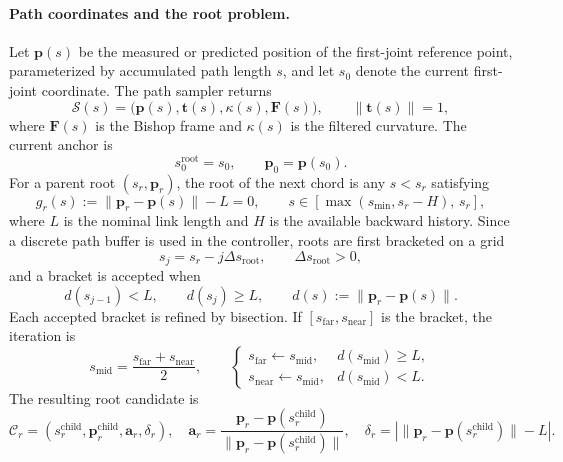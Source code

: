 \documentclass[12pt,a4paper]{report}
\begin{document}
\paragraph{Path coordinates and the root problem.}
Let $\mathbf{p}(s)$ be the measured or predicted position of the first-joint
reference point, parameterized by accumulated path length $s$, and let
$s_0$ denote the current first-joint coordinate. The path sampler returns
\[
\mathcal{S}(s)=
\bigl(\mathbf{p}(s),\mathbf{t}(s),\kappa(s),\mathbf{F}(s)\bigr),
\qquad \|\mathbf{t}(s)\|=1,
\]
where $\mathbf{F}(s)$ is the Bishop frame and $\kappa(s)$ is the filtered
curvature. The current anchor is
\begin{equation}
s_0^{\mathrm{root}}=s_0,\qquad
\mathbf{p}_0=\mathbf{p}(s_0).
\tag{8.84}
\label{eq:ch8-root-anchor}
\end{equation}
For a parent root $(s_r,\mathbf{p}_r)$, the root of the next chord is any
$s<s_r$ satisfying
\begin{equation}
g_r(s):=\|\mathbf{p}_r-\mathbf{p}(s)\|-L=0,
\qquad
s\in\left[\max(s_{\min},s_r-H),\,s_r\right],
\tag{8.85}
\label{eq:ch8-root-equation}
\end{equation}
where $L$ is the nominal link length and $H$ is the available backward
history. Since a discrete path buffer is used in the controller, roots are
first bracketed on a grid
\begin{equation}
s_j=s_r-j\Delta s_{\mathrm{root}},
\qquad \Delta s_{\mathrm{root}}>0,
\tag{8.86}
\end{equation}
and a bracket is accepted when
\begin{equation}
d(s_{j-1})<L,\qquad d(s_j)\geq L,\qquad
d(s):=\|\mathbf{p}_r-\mathbf{p}(s)\|.
\tag{8.87}
\label{eq:ch8-root-bracket}
\end{equation}
Each accepted bracket is refined by bisection. If
$[s_{\mathrm{far}},s_{\mathrm{near}}]$ is the bracket, the iteration is
\begin{equation}
s_{\mathrm{mid}}=\frac{s_{\mathrm{far}}+s_{\mathrm{near}}}{2},
\qquad
\begin{cases}
s_{\mathrm{far}}\leftarrow s_{\mathrm{mid}},&
d(s_{\mathrm{mid}})\geq L,\\
s_{\mathrm{near}}\leftarrow s_{\mathrm{mid}},&
d(s_{\mathrm{mid}})<L .
\end{cases}
\tag{8.88}
\label{eq:ch8-root-bisection}
\end{equation}
The resulting root candidate is
\begin{equation}
\mathcal{C}_r=
(s_r^{\mathrm{child}},\mathbf{p}_r^{\mathrm{child}},
\mathbf{a}_r,\delta_r),\quad
\mathbf{a}_r=
\frac{\mathbf{p}_r-\mathbf{p}(s_r^{\mathrm{child}})}
{\|\mathbf{p}_r-\mathbf{p}(s_r^{\mathrm{child}})\|},
\quad
\delta_r=
\left|\|\mathbf{p}_r-\mathbf{p}(s_r^{\mathrm{child}})\|-L\right|.
\tag{8.89}
\label{eq:ch8-root-candidate}
\end{equation}
\end{document}
